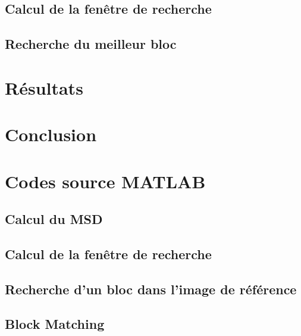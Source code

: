 \documentclass[a4paper, 12pt]{article}
\newcommand{\FSource}[1]{%

}
\begin{document}
\subsection{Calcul de la fenêtre de recherche}

\subsection{Recherche du meilleur bloc}

\section{Résultats}

\newpage

\section{Conclusion}


\clearpage

%
%
\appendix

\section{Codes source MATLAB}

\subsection{Calcul du MSD}\label{msd_code}

\FSource{../compute_msd.m}

\newpage

\subsection{Calcul de la fenêtre de recherche}\label{search_window}

\FSource{../search_window.m}

\newpage

\subsection{Recherche d'un bloc dans l'image de référence}\label{block_search}

\FSource{../block_matching.m}

\newpage

\subsection{Block Matching}\label{block_matching}

\FSource{../block_matching_encode.m}
\end{document}
